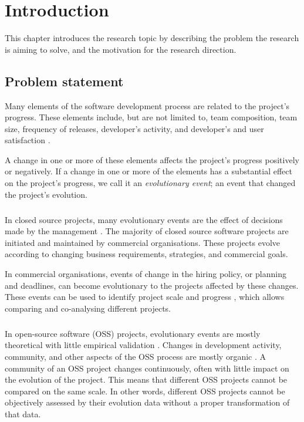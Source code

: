 \chapter{Introduction}
\label{introduction}

This chapter introduces the research topic by describing the problem the
research is aiming to solve, and the motivation for the research direction.

\section{Problem statement}
Many elements of the software development process are related to the project's
progress. These elements include, but are not limited to, team composition,
team size, frequency of releases, developer's activity, and developer's and
user satisfaction \cite{crowston2006, delone1992, samoladas2010}.

A change in one or more of these elements affects the project's progress
positively or negatively. If a change in one or more of the elements has a
substantial effect on the project's progress, we call it an \emph{evolutionary
event}\rm; an event that changed the project's evolution.

\paragraph{}
In closed source projects, many evolutionary events are the effect of decisions
made by the management \cite{karus2013}. The majority of closed source software
projects are initiated and maintained by commercial organisations. These
projects evolve according to changing business requirements, strategies, and
commercial goals.

In commercial organisations, events of change in the hiring policy, or
planning and deadlines, can become evolutionary to the projects affected by
these changes. These events can be used to identify project scale and progress
\cite{karus2013}, which allows comparing and co-analysing different projects.

\paragraph{}
In open-source software (OSS) projects, evolutionary events are mostly
theoretical with little empirical validation \cite{karus2013}. Changes in
development activity, community, and other aspects of the OSS process are
mostly organic \cite{androutsellis}. A community of an OSS project changes
continuously, often with little impact on the evolution of the project. This
means that different OSS projects cannot be compared on the same scale. In
other words, different OSS projects cannot be objectively assessed by their
evolution data without a proper transformation of that data.

